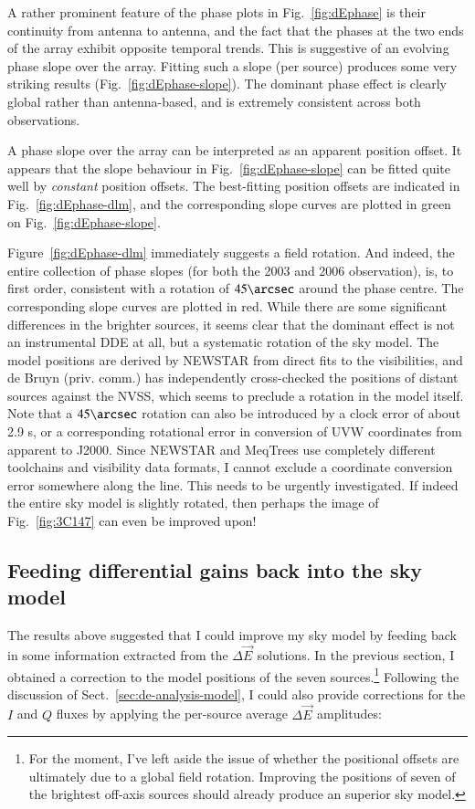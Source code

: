\documentclass[]{aa}
\newcommand{\jones}[2]{\vec {#1}_{#2}}
\begin{document}
A rather prominent feature of the phase plots in Fig.~\ref{fig:dEphase} is their continuity from antenna to antenna, and the fact that the phases at the two ends of the array exhibit opposite temporal trends. This is suggestive of an evolving phase slope over the array. Fitting such a slope (per source) produces some very striking results (Fig.~\ref{fig:dEphase-slope}). The dominant phase effect is clearly global rather than antenna-based, and is extremely consistent across both observations.

A phase slope over the array can be interpreted as an apparent position offset. It appears that the slope behaviour in Fig.~\ref{fig:dEphase-slope} can be fitted quite well by \emph{constant} position offsets. 
The best-fitting position offsets are indicated in Fig.~\ref{fig:dEphase-dlm}, and the corresponding slope curves are plotted in green on Fig.~\ref{fig:dEphase-slope}. 

Figure~\ref{fig:dEphase-dlm} immediately suggests a field rotation. And indeed, the entire collection of phase slopes (for both the 2003 and 2006 observation), is, to first order, consistent with a rotation of $45\arcsec$ around the phase centre. The corresponding slope curves are plotted in red. While there are some significant differences in the brighter sources, it seems clear that the dominant effect is not an instrumental DDE at all, but a systematic rotation of the sky model. The model positions are derived by NEWSTAR from direct fits to the visibilities, and de Bruyn (priv. comm.) has independently cross-checked the positions of distant sources against the NVSS, which seems to preclude a rotation in the model itself. Note that a $45\arcsec$ rotation can also be introduced by a clock error of about 2.9 s, or a corresponding rotational error in conversion of UVW coordinates from apparent to J2000. Since NEWSTAR and MeqTrees use completely different toolchains and visibility data formats, I cannot exclude a coordinate conversion error somewhere along the line. This needs to be urgently investigated. If indeed the entire sky model is slightly rotated, then perhaps the image of Fig.~\ref{fig:3C147} can even be improved upon!

\subsection{Feeding differential gains back into the sky model\label{sec:model-improvement}}

The results above suggested that I could improve my sky model by feeding back in some information extracted from the $\Delta\jones{E}{}$ solutions. In the previous section, I obtained a correction to the model positions of the seven sources.\footnote{For the moment, I've left aside the issue of whether the positional offsets are ultimately due to a global field rotation. Improving the positions of seven of the brightest off-axis sources should already produce an superior sky model.} Following the discussion of Sect.~\ref{sec:de-analysis-model}, I could also provide corrections for the $I$ and $Q$ fluxes by applying the per-source average $\Delta\jones{E}{}$ amplitudes:
\end{document}
